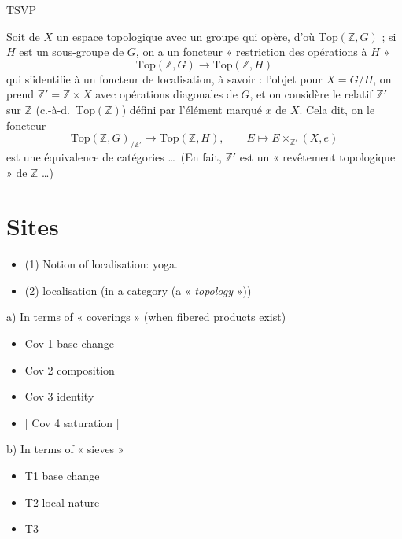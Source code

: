 \documentclass[11pt,a4paper]{article}
\begin{document}
TSVP

Soit de   $X$ un espace topologique avec
\struck{\ill{}} un groupe  qui opère, d'où
 $\mathrm{Top}(\mathbb{Z}, G)$ ; si $H$ est un sous-groupe
de $G$, on a un foncteur « restriction des opérations à $H$ »
\[
\mathrm{Top}(\mathbb{Z}, G) \longrightarrow \mathrm{Top}(\mathbb{Z}, H)
\]
qui s'identifie à un foncteur de localisation, à savoir : l'objet \ill{} pour
$X = G/H$, on prend $\mathbb{Z}' = \mathbb{Z} \times X$ avec opérations
diagonales de $G$, et on considère le relatif $\mathbb{Z}'$ sur $\mathbb{Z}$
(c.-à-d.\ $\mathrm{Top}(\mathbb{Z})$) défini par l'élément marqué $x$ de $X$. Cela
dit, on  le foncteur
\[
\mathrm{Top}(\mathbb{Z}, G)_{/\mathbb{Z}'} \longrightarrow
\mathrm{Top}(\mathbb{Z}, H), \qquad E \longmapsto E \times_{\mathbb{Z}'}(X, e)
\]
est une équivalence de catégories \ldots\ (En fait, $\mathbb{Z}'$ est un
« revêtement topologique » de $\mathbb{Z}$ \ldots)

\section*{Sites}

\begin{itemize}
\item (1) Notion of localisation: yoga.
\item (2) localisation  (in a category (a
« \emph{topology} »))
\end{itemize}

a) In terms of « coverings » (when fibered products exist)
\begin{itemize}
\item Cov 1   base change
\item Cov 2   composition
\item Cov 3   identity
\item $[$ Cov 4   saturation $]$
\end{itemize}

b) In terms of « sieves » 
\begin{itemize}
\item T1   base change
\item T2   local nature
\item T3   \struck{\ill{}}
\end{itemize}
\end{document}

